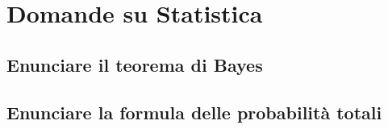 \documentclass[\main/main.tex]{subfiles}
\begin{document}
\section{Domande su Statistica}
\subsection{Enunciare il teorema di Bayes}
\bayesTh
\subsection{Enunciare la formula delle probabilità totali}
\formulaProbTot

\clearpage

\clearpage

\clearpage

\clearpage

\clearpage

\end{document}
